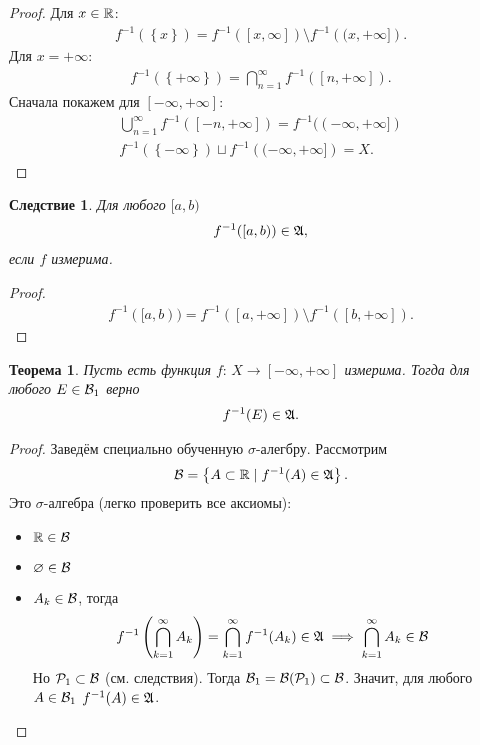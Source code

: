 \documentclass[a4paper,14pt]{extarticle}
\newcounter{theoremCnt}
\theoremstyle{definition}
\theoremstyle{plain}
\newtheorem{thm}[theoremCnt]{Теорема}
\theoremstyle{plain}
\theoremstyle{plain}
\newtheorem{crly}[theoremCnt]{Следствие}
\theoremstyle{plain}
\theoremstyle{definition}
\theoremstyle{definition}
\theoremstyle{definition}
\theoremstyle{definition}
\theoremstyle{definition}
\theoremstyle{definition}
\theoremstyle{plain}
\theoremstyle{plain}
\theoremstyle{plain}
\theoremstyle{plain}
\theoremstyle{definition}
\theoremstyle{definition}
\theoremstyle{definition}
\theoremstyle{definition}
\theoremstyle{definition}
\newcommand{\R}{\ensuremath \mathbb{R}}
\newcommand{\A}{\ensuremath \mathfrak{A}}
\newcommand{\p}{\ensuremath \mathcal{P}}
\begin{document}
\begin{proof} Для $x \in \R$:
 \begin{align*}
  f^{-1}( \left\{ x \right\} ) = f^{-1}( [x, \infty] ) \setminus f^{-1} \left( (x, +\infty] \right)
  .\end{align*}  Для $x = +\infty$:
 \begin{align*}
  f^{-1} \left( \left\{ +\infty \right\} \right) = \bigcap_{n=1}^{\infty} f^{-1} \left( [n, +\infty] \right)
  .\end{align*} Сначала покажем для $[-\infty, +\infty]$:
 \begin{align*}
  \bigcup_{n=1}^{\infty} f^{-1}([-n, +\infty]) = f^{-1}( (-\infty, +\infty] ) \\
  f^{-1}(\left\{ -\infty \right\}) \sqcup f^{-1} \left( (-\infty, +\infty] \right) = X
  .\end{align*}
\end{proof}
\begin{crly}
 Для любого $[a, b)$
 \begin{align*}
  f^{-1}([a, b)) \in \A
  ,\end{align*} если $f$ измерима.
\end{crly}
\begin{proof}
 \begin{align*}
  f^{-1}( [a, b) ) = f^{-1} \left( [a, +\infty] \right) \setminus f^{-1} \left( [b, +\infty] \right)
  .\end{align*}
\end{proof}
\begin{thm}
 Пусть есть функция $f \colon\, X \to [-\infty, +\infty] $ измерима. Тогда для любого $E \in \mathcal{B}_1$ верно
 \begin{align*}
  f^{-1}(E) \in \A
  .\end{align*}
\end{thm}
\begin{proof}
 Заведём специально обученную $\sigma$-алегбру. Рассмотрим
 \begin{align*}
  \B = \left\{ A \subset \R \mid f^{-1}(A) \in \A \right\}
  .\end{align*} Это $\sigma$-алгебра (легко проверить все аксиомы):
 \begin{itemize}
  \item $\R \in \B$
  \item $\varnothing \in \mathcal{B}$
  \item $A_k \in \mathcal{B}$, тогда
  \begin{align*}
   f^{-1}\left(\bigcap_{k=1}^{\infty} A_k \right) = \bigcap_{k=1}^{\infty} f^{-1}(A_k) \in \A \implies \bigcap_{k=1}^{\infty} A_k \in \B
  \end{align*}
  Но $\p_1 \subset \B$ (см. следствия). Тогда $\B_1 = \B(\p_1) \subset \B$. Значит, для любого  $A \in \mathcal{B}_1$ $f^{-1}(A) \in \A$.
 \end{itemize}
\end{proof}
\end{document}
